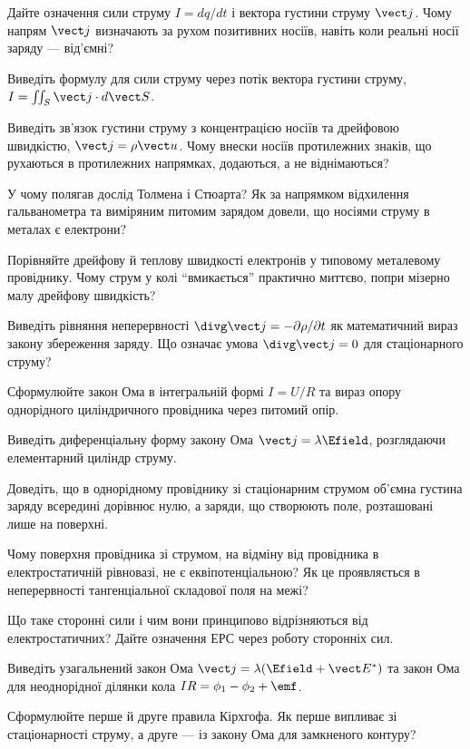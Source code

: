 \begin{Questions}
\begin{quizlist}
	\item Дайте означення сили струму $I=dq/dt$ і вектора густини струму $\vect j$. Чому напрям $\vect j$ визначають за рухом позитивних носіїв, навіть коли реальні носії заряду --- від'ємні?
	\item Виведіть формулу для сили струму через потік вектора густини струму, $I = \iint_S\vect j\cdot d\vect S$.
	\item Виведіть зв'язок густини струму з концентрацією носіїв та дрейфовою швидкістю, $\vect j = \rho\vect u$. Чому внески носіїв протилежних знаків, що рухаються в протилежних напрямках, додаються, а не віднімаються?
	\item У чому полягав дослід Толмена і Стюарта? Як за напрямком відхилення гальванометра та виміряним питомим зарядом довели, що носіями струму в металах є електрони?
	\item Порівняйте дрейфову й теплову швидкості електронів у типовому металевому провіднику. Чому струм у колі \enquote{вмикається} практично миттєво, попри мізерно малу дрейфову швидкість?
	\item Виведіть рівняння неперервності $\divg\vect j = -\partial\rho/\partial t$ як математичний вираз закону збереження заряду. Що означає умова $\divg\vect j=0$ для стаціонарного струму?
	\item Сформулюйте закон Ома в інтегральній формі $I=U/R$ та вираз опору однорідного циліндричного провідника через питомий опір.
	\item Виведіть диференціальну форму закону Ома $\vect j = \lambda\Efield$, розглядаючи елементарний циліндр струму.
	\item Доведіть, що в однорідному провіднику зі стаціонарним струмом об'ємна густина заряду всередині дорівнює нулю, а заряди, що створюють поле, розташовані лише на поверхні.
	\item Чому поверхня провідника зі струмом, на відміну від провідника в електростатичній рівновазі, не є еквіпотенціальною? Як це проявляється в неперервності тангенціальної складової поля на межі?
	\item Що таке сторонні сили і чим вони принципово відрізняються від електростатичних? Дайте означення ЕРС через роботу сторонніх сил.
	\item Виведіть узагальнений закон Ома $\vect j = \lambda(\Efield+\vect E^*)$ та закон Ома для неоднорідної ділянки кола $IR = \phi_1-\phi_2+\emf$.
	\item Сформулюйте перше й друге правила Кірхгофа. Як перше випливає зі стаціонарності струму, а друге --- із закону Ома для замкненого контуру?

\end{quizlist}
\end{Questions}
